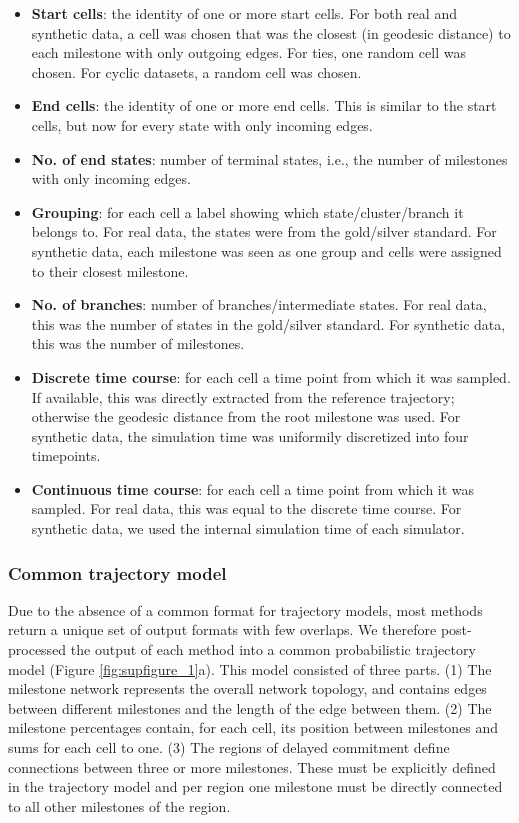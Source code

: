 \begin{itemize}
	\item \textbf{Start cells}: the identity of one or more start cells. For both real and synthetic data, a cell was chosen that was the closest (in geodesic distance) to each milestone with only outgoing edges. For ties, one random cell was chosen. For cyclic datasets, a random cell was chosen.
	\item \textbf{End cells}: the identity of one or more end cells. This is similar to the start cells, but now for every state with only incoming edges.
	\item \textbf{No. of end states}: number of terminal states, i.e., the number of milestones with only incoming edges.
	\item \textbf{Grouping}: for each cell a label showing which state/cluster/branch it belongs to. For real data, the states were from the gold/silver standard. For synthetic data, each milestone was seen as one group and cells were assigned to their closest milestone.
	\item \textbf{No. of branches}: number of branches/intermediate states. For real data, this was the number of states in the gold/silver standard. For synthetic data, this was the number of milestones.
	\item \textbf{Discrete time course}: for each cell a time point from which it was sampled. If available, this was directly extracted from the reference trajectory; otherwise the geodesic distance from the root milestone was used. For synthetic data, the simulation time was uniformily discretized into four timepoints.
	\item \textbf{Continuous time course}: for each cell a time point from which it was sampled. For real data, this was equal to the discrete time course. For synthetic data, we used the internal simulation time of each simulator.
\end{itemize}



\subsubsection{Common trajectory model}

Due to the absence of a common format for trajectory models, most methods return a unique set of output formats with few overlaps. We therefore post-processed the output of each method into a common probabilistic trajectory model (Figure \ref{fig:supfigure_1}a). This model consisted of three parts. (1) The milestone network represents the overall network topology, and contains edges between different milestones and the length of the edge between them. (2) The milestone percentages contain, for each cell, its position between milestones and sums for each cell to one. (3) The regions of delayed commitment define connections between three or more milestones. These must be explicitly defined in the trajectory model and per region one milestone must be directly connected to all other milestones of the region.

